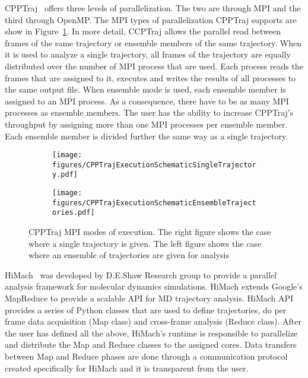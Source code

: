 CPPTraj~\cite{cpptraj-2013} offers three levels of parallelization. The two are through MPI and the third through OpenMP.
The MPI types of parallelization CPPTraj supports are show in Figure~\ref{fig:cpptraj_arch}. In more detail,
CCPTraj allows the parallel read between frames of the same trajectory or ensemble members of
the same trajectory. When it is used to analyze a single trajectory, all frames of the trajectory
are equally distributed over the number of MPI process that are used. Each process reads the frames
that are assigned to it, executes and writes the results of all processes to the same output file.
When ensemble mode is used, each ensemble member is assigned to an MPI process. As a consequence,
there have to be as many MPI processes as ensemble members. The user has the ability to increase 
CPPTraj's throughput by assigning more than one MPI processes per ensemble member. Each ensemble 
member is divided further the same way as a single trajectory.
\begin{figure}[ht!]
		\begin{subfigure}{.5\textwidth}
		\centering
		\texttt{[image: figures/CPPTrajExecutionSchematicSingleTrajectory.pdf]}
	\end{subfigure}
	\begin{subfigure}{.5\textwidth}
		\centering
		\texttt{[image: figures/CPPTrajExecutionSchematicEnsembleTrajectories.pdf]}
	\end{subfigure}
	\caption{CPPTraj MPI modes of execution. The right figure shows the case where a single trajectory is
		given. The left figure shows the case where an ensemble of trajectories are given for analysis}
	\label{fig:cpptraj_arch}
\end{figure}

HiMach~\cite{himach-2008} was developed by D.E.Shaw Research group to provide a parallel analysis
framework for molecular dynamics simulations. HiMach extends Google's MapReduce
to provide a scalable API for MD trajectory analysis. HiMach API provides a series
of Python classes that are used to define trajectories, do per frame data acquisition
(Map class) and cross-frame analysis (Reduce class). After the user has defined all 
the above, HiMach's runtime is responsible to parallelize and distribute the Map and 
Reduce classes to the assigned cores. Data transfers between Map and Reduce phases are
done through a communication protocol created specifically for HiMach and it is transparent
from the user.